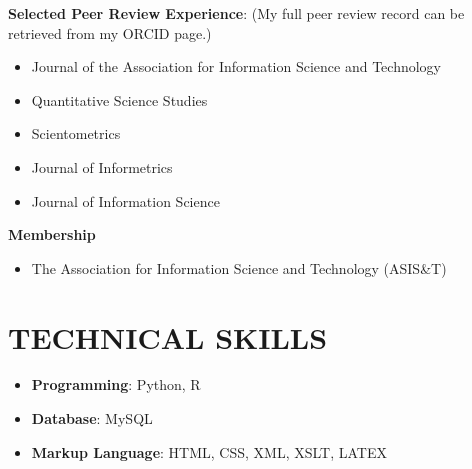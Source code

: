 \documentclass[margin, 10pt]{res} %
\begin{document}
\begin{resume}
\textbf{Selected Peer Review Experience}:  
(My full peer review record can be retrieved from my ORCID page.)

\begin{itemize}
\item Journal of the Association for Information Science and Technology
\item Quantitative Science Studies
\item Scientometrics
\item Journal of Informetrics
\item Journal of Information Science
\end{itemize}

\textbf{Membership}
\begin{itemize}
\item The Association for Information Science and Technology (ASIS\&T)
\end{itemize}

\section{TECHNICAL SKILLS}
\begin{itemize}
\item \textbf{Programming}: Python, R
\item \textbf{Database}: MySQL
\item \textbf{Markup Language}: HTML, CSS, XML, XSLT, LATEX
\end{itemize}



\end{resume}
\end{document}
